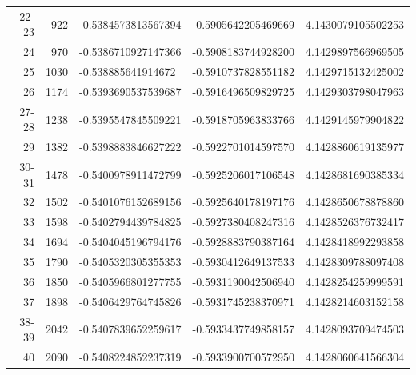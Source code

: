 \documentclass[10pt,twoside]{report}
\begin{document}
\begin{table}
\begin{tabular}{rrlll}
			22-23 & 922 & -0.5384573813567394 & -0.5905642205469669 & 4.1430079105502253\\ 
			24 & 970 & -0.5386710927147366 & -0.5908183744928200 & 4.1429897566969505\\ 
			25 & 1030 & -0.538885641914672 & -0.5910737828551182 & 4.1429715132425002\\ 
			26 & 1174 & -0.5393690537539687 & -0.5916496509829725 & 4.1429303798047963\\ 
			27-28 & 1238 & -0.5395547845509221 & -0.5918705963833766 & 4.1429145979904822\\ 
			29 & 1382 & -0.5398883846627222 & -0.5922701014597570 & 4.1428860619135977\\ 
			30-31 & 1478 & -0.5400978911472799 & -0.5925206017106548 & 4.1428681690385334\\
			32 & 1502 & -0.5401076152689156 & -0.5925640178197176 & 4.1428650678878860\\ 
			33 & 1598 & -0.5402794439784825 & -0.5927380408247316 & 4.1428526376732417\\ 
			34 & 1694 & -0.5404045196794176 & -0.5928883790387164 & 4.1428418992293858\\ 
			35 & 1790 & -0.5405320305355353 & -0.5930412649137533 & 4.1428309788097408\\ 
			36 & 1850 & -0.5405966801277755 & -0.5931190042506940 & 4.1428254259999591\\ 
			37 & 1898 & -0.5406429764745826 & -0.5931745238370971 & 4.1428214603152158\\ 
			38-39 & 2042 & -0.5407839652259617 & -0.5933437749858157 & 4.1428093709474503\\ 
			40 & 2090 & -0.5408224852237319 & -0.5933900700572950 & 4.1428060641566304\\ 
		\end{tabular}
	\end{table}
	\newpage
	
\end{document}
